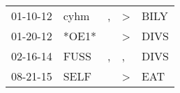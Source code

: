 \begin{supertabular}{p{0.07\textwidth}p{0.06\textwidth}p{0.02\textwidth}p{0.02\textwidth}p{0.06\textwidth}}
 01-10-12\textsuperscript{} &  cyhm\textsuperscript{} &  , &  \textgreater &  BILY\textsuperscript{} \\
 01-20-12\textsuperscript{} &                   *OE1* &    &  \textgreater &  DIVS\textsuperscript{} \\
 02-16-14\textsuperscript{} &  FUSS\textsuperscript{} &  , &             , &  DIVS\textsuperscript{} \\
 08-21-15\textsuperscript{} &  SELF\textsuperscript{} &    &  \textgreater &   EAT\textsuperscript{} \\
\end{supertabular}
